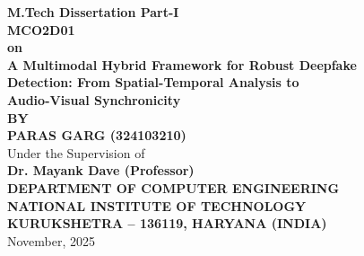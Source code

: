 \documentclass[12pt,oneside,a4paper]{report}
\numberwithin{figure}{chapter}
\numberwithin{table}{chapter}
\begin{document}
\pagestyle{empty}
\setcounter{page}{1}

\begin{titlepage}
    \thispagestyle{empty}

    \vspace*{0.5cm}
    \begin{center}
        {\Large \textbf{M.Tech Dissertation Part-I}}\\[0.3cm]
        {\Large \textbf{MCO2D01}}\\[1cm]

        {\large \textbf{on}}\\[1cm]

        {\LARGE \textbf{A Multimodal Hybrid Framework for Robust Deepfake}}\\[0.2cm]
        {\LARGE \textbf{Detection: From Spatial-Temporal Analysis to}}\\[0.2cm]
        {\LARGE \textbf{Audio-Visual Synchronicity}}\\[1.5cm]

        {\large \textbf{BY}}\\[0.5cm]
        {\Large \textbf{PARAS GARG (324103210)}}\\[1.5cm]

        {\large Under the Supervision of}\\[0.3cm]
        {\large \textbf{Dr. Mayank Dave (Professor)}}\\[1cm]


        {\large \textbf{DEPARTMENT OF COMPUTER ENGINEERING}}\\[0.3cm]
        {\large \textbf{NATIONAL INSTITUTE OF TECHNOLOGY}}\\[0.3cm]
        {\large \textbf{KURUKSHETRA -- 136119, HARYANA (INDIA)}}\\[0.5cm]
        {\large November, 2025}
    \end{center}
\end{titlepage}
\end{document}
